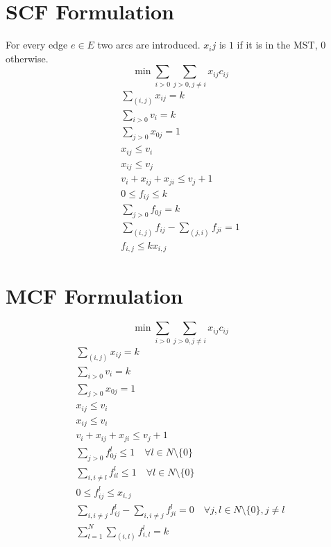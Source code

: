 \documentclass[a4paper]{article}
\begin{document}
\section{SCF Formulation}
For every edge $e \in E$ two arcs are introduced. $x_ij$ is $1$ if it is in the MST, $0$ otherwise.
\begin{equation}
	\min \sum_{i>0}{ \sum_{j>0,j\not =i}{x_{ij}c_{ij}}}
\end{equation}
\begin{align}
	\sum_{(i,j)} x_{ij} = k\\
	\sum_{i>0}v_i =k \\
	\sum_{j>0} x_{0j}=1\\
	x_{ij} \leq v_i\\
	x_{ij} \leq v_j\\
	v_i + x_{ij} + x_{ji} \leq v_j + 1\\
	0 \leq f_{ij} \leq k\\
	\sum_{j>0} f_{0j}=k \\
	\sum_{(i,j)} f_{ij} - \sum_{(j,i)} f_{ji} = 1\\
	f_{i,j}\leq kx_{i,j}
\end{align}

\section{MCF Formulation}
\begin{equation}
	\min \sum_{i>0}{ \sum_{j>0,j\not =i}{x_{ij}c_{ij}}}
\end{equation}
\begin{align}
	\sum_{(i,j)} x_{ij} = k\\
	\sum_{i>0}v_i =k \\
	\sum_{j>0} x_{0j}=1\\
	x_{ij} \leq v_i\\
	x_{ij} \leq v_i\\
	v_i + x_{ij} + x_{ji} \leq v_j + 1\\
	\sum_{j>0} f_{0j}^l \leq 1 \quad \forall l\in N\setminus\{0\}\\
	\sum_{i,i\not =l} f_{il}^l \leq 1 \quad \forall l\in N\setminus\{0\}\\
	0\leq f_{ij}^l \leq x_{i,j}\\
	\sum_{i,i\not = j}f_{ij}^l - \sum_{i,i\not = j} f_{ji}^l =0 \quad \forall j, l\in N\setminus\{0\}, j\not =l \\
	\sum_{l=1}^N \sum_{(i,l)} f_{i,l}^l =k
\end{align}
\end{document}
